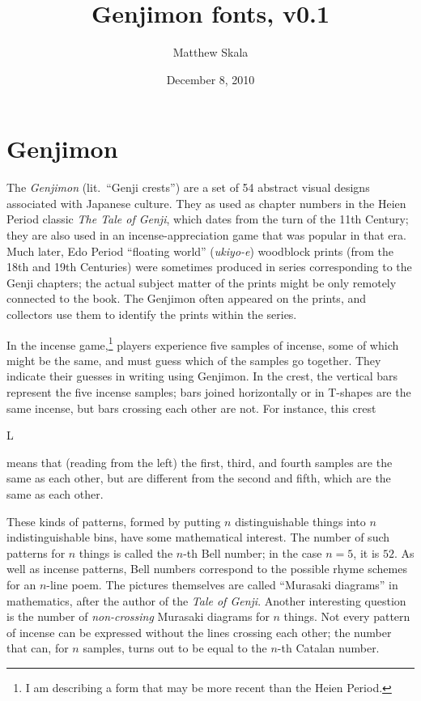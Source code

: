 \documentclass[12pt]{article}
\title{Genjimon fonts, v0.1}
\author{Matthew Skala}
\date{December 8, 2010}
\newcommand\genji[1]{{\genjiface #1}}
\begin{document}

\maketitle

\section{Genjimon}

The \textit{Genjimon} (lit.~``Genji crests'') are a set of 54 abstract
visual designs associated with Japanese culture.  They as used as chapter
numbers in the Heien Period classic \textit{The Tale of Genji}, which dates
from the turn of the 11th Century; they are also used in an
incense-appreciation game that was popular in that era.  Much later, Edo
Period ``floating world'' (\textit{ukiyo-e}) woodblock prints (from the 18th
and 19th Centuries) were sometimes produced in series corresponding to the
Genji chapters; the actual subject matter of the prints might be only
remotely connected to the book.  The Genjimon often appeared on the prints,
and collectors use them to identify the prints within the series.

In the incense game,\footnote{I am describing a form that may be more recent
than the Heien Period.} players experience five samples of incense, some
of which might be the same, and must guess which of the samples go together.
They indicate their guesses in writing using
Genjimon.  In the crest, the vertical bars represent the five incense
samples; bars joined horizontally or in \textsf{T}-shapes are the same
incense, but bars crossing each other are not.  For instance, this crest
\begin{center}
  \Huge\genji{L}
\end{center}
means that (reading from the left) the first, third, and fourth samples are
the same as each other, but are different from the second and fifth, which are
the same as each other.

These kinds of patterns, formed by putting $n$ distinguishable things into
$n$ indistinguishable bins, have some mathematical interest.  The number of
such patterns for $n$ things is called the $n$-th Bell number; in the case
$n=5$, it is $52$. As well as incense patterns, Bell numbers correspond to
the possible rhyme schemes for an $n$-line poem.  The pictures themselves
are called ``Murasaki diagrams'' in mathematics, after the author of the
\textit{Tale of Genji}.  Another interesting question is the number of
\emph{non-crossing} Murasaki diagrams for $n$ things.  Not every pattern of
incense can be expressed without the lines crossing each other; the number
that can, for $n$ samples, turns out to be equal to the $n$-th Catalan
number.
\end{document}
